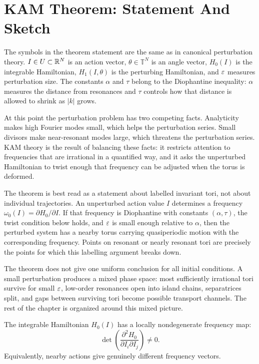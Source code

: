 \section{KAM Theorem: Statement And Sketch}
\label{sec:kam-theorem-sketch}

The symbols in the theorem statement are the same as in canonical perturbation
theory.  \(I\in U\subset\mathbb{R}^N\) is an action vector, \(\theta\in\mathbb T^N\)
is an angle vector, \(H_0(I)\) is the integrable Hamiltonian, \(H_1(I,\theta)\)
is the perturbing Hamiltonian, and \(\varepsilon\) measures perturbation size.  The
constants \(\alpha\) and \(\tau\) belong to the Diophantine inequality:
\(\alpha\) measures the distance from resonances and \(\tau\) controls how that
distance is allowed to shrink as \(|k|\) grows.

At this point the perturbation problem has two competing facts. Analyticity
makes high Fourier modes small, which helps the perturbation series. Small
divisors make near-resonant modes large, which threatens the perturbation
series. KAM theory is the result of balancing these facts: it restricts
attention to frequencies that are irrational in a quantified way, and it asks
the unperturbed Hamiltonian to twist enough that frequency can be adjusted when
the torus is deformed.

The theorem is best read as a statement about labelled invariant tori, not
about individual trajectories. An unperturbed action value \(I\) determines a
frequency \(\omega_0(I)=\partial H_0/\partial I\). If that frequency is
Diophantine with constants \((\alpha,\tau)\), the twist condition below holds,
and \(\varepsilon\) is small enough relative to \(\alpha\), then the perturbed system
has a nearby torus carrying quasiperiodic motion with the corresponding
frequency. Points on resonant or nearly resonant tori are precisely the points
for which this labelling argument breaks down.

The theorem does not give one uniform conclusion for all initial conditions. A
small perturbation produces a mixed phase space: most sufficiently irrational
tori survive for small \(\varepsilon\), low-order resonances open into island chains,
separatrices split, and gaps between surviving tori become possible transport
channels. The rest of the chapter is organized around this mixed picture.

\begin{hypothesis}
The integrable Hamiltonian \(H_0(I)\) has a locally nondegenerate frequency map:
\[
  \det\left(\frac{\partial^2H_0}{\partial I_i\partial I_j}\right)\neq0.
\]
Equivalently, nearby actions give genuinely different frequency vectors.
\end{hypothesis}

